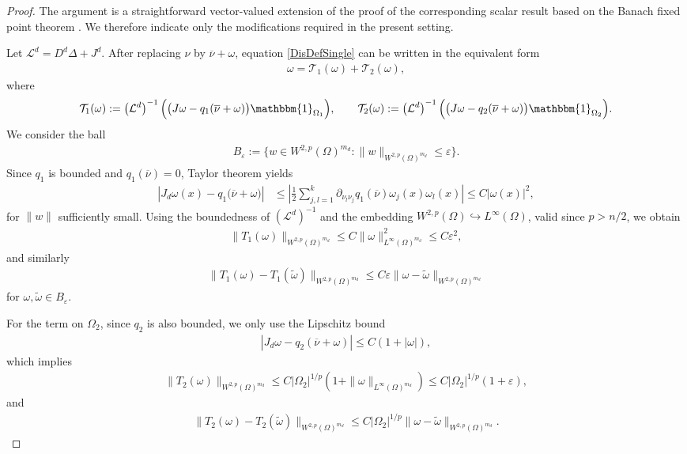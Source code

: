 \documentclass[12pt, a4paper]{amsart}
\numberwithin{equation}{section}
\newcommand{\md}{m_{d}}  %
\renewcommand{\L}{{\mathcal{L}}}
\begin{document}
\begin{proof}
The argument is a straightforward vector-valued extension of the proof of the corresponding scalar result based on the Banach fixed point theorem \cite[Lemma 3.2]{Cygan2023}. We therefore indicate only the modifications required in the present setting.

Let $\L^d = D^d\Delta + J^d$.
After replacing \(\nu\) by \(\overline{\nu}+\omega\), equation \eqref{DisDefSingle} can be written in the equivalent form
\begin{align}
\omega = \mathcal T_1(\omega)+\mathcal T_2(\omega),
\end{align}
where
\begin{align}
\mathcal T_1(\omega):=\left(\mathcal L^d\right)^{-1}\Bigl(\bigl(J\omega-q_1(\overline{\nu}+\omega)\bigr)\mathbbm{1}_{\Omega_1}\Bigr),
\qquad
\mathcal T_2(\omega):=\left(\mathcal L^d\right)^{-1}\Bigl(\bigl(J\omega-q_2(\overline{\nu}+\omega)\bigr)\mathbbm{1}_{\Omega_2}\Bigr).
\end{align}
We consider the ball
\begin{align}
B_\varepsilon:=\{w\in W^{2,p}(\Omega)^{\md}:\|w\|_{W^{2,p}(\Omega)^{\md}}\le \varepsilon\}.
\end{align}
Since $q_1$ is bounded and $q_1(\overline{\nu}) = 0$, Taylor theorem yields
    \begin{align*}
        \left|J_d\omega(x) - q_1\big(\overline\nu+\omega\big)\right|
        &\leqslant \left| \frac{1}{2} \sum_{j,l=1}^k \partial_{\nu_l\nu_j} q_1(\overline\nu) \omega_j(x) \omega_l(x)\right|
        \leqslant C\left|\omega(x)\right|^2,
\end{align*}
for $\|w\|$ sufficiently small. Using the boundedness of $(\mathcal L^d)^{-1}$ and the embedding
\(W^{2,p}(\Omega)\hookrightarrow L^\infty(\Omega)\), valid since \(p>n/2\), we obtain
\begin{align}
\|T_1(\omega)\|_{W^{2,p}(\Omega)^{\md}}
\le C\|\omega\|_{L^\infty(\Omega)^{\md}}^2
\le C\varepsilon^2,
\end{align}
and similarly
\begin{align}
\|T_1(\omega)-T_1(\widetilde \omega)\|_{W^{2,p}(\Omega)^{\md}}
\le C\varepsilon \|\omega-\widetilde \omega\|_{W^{2,p}(\Omega)^{\md}}
\end{align}
for \(\omega,\widetilde \omega\in B_\varepsilon\).

For the term on \(\Omega_2\), since $q_2$ is also bounded, we only use the Lipschitz bound
\begin{align}
|J_d\omega-q_2(\overline{\nu}+\omega)|\leqslant C(1+|\omega|),
\end{align}
which implies
\begin{align}
\|T_2(\omega)\|_{W^{2,p}(\Omega)^{\md}}
\leqslant C |\Omega_2|^{1/p}(1+\|\omega\|_{L^\infty(\Omega)^{\md}})
\leqslant C |\Omega_2|^{1/p}(1+\varepsilon),
\end{align}
and
\begin{align}
\|T_2(\omega)-T_2(\widetilde \omega)\|_{W^{2,p}(\Omega)^{\md}}
\leqslant C |\Omega_2|^{1/p}\|\omega-\widetilde \omega\|_{W^{2,p}(\Omega)^{\md}}.
\end{align}


\end{proof}
\end{document}
